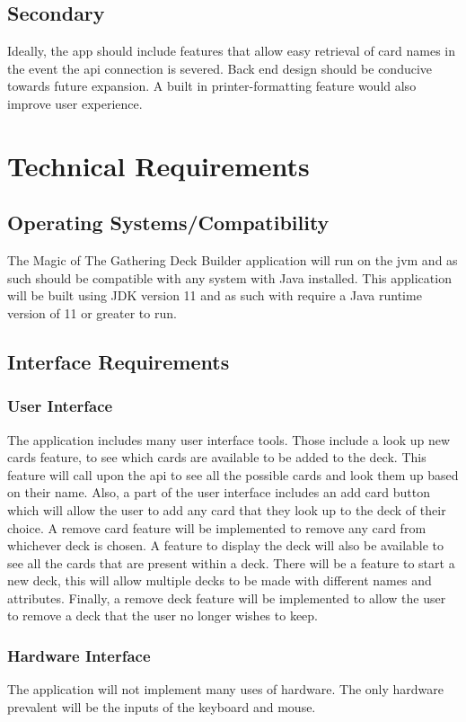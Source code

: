 \documentclass[12pt]{report}
\newcommand{\javaversion}{11 }
\begin{document}
\section{Secondary}
Ideally, the app should include features that allow easy retrieval of card names in the event the \acrshort{api} connection is severed. Back end design should be conducive towards future expansion. A built in printer-formatting feature would also improve user experience. 
\chapter{Technical Requirements}
\section{Operating Systems/Compatibility}
The Magic of The Gathering Deck Builder application will run on the \acrshort{jvm} and as such should be compatible with any system with Java installed. This application will be built using JDK version \javaversion and as such with require a Java runtime version of \javaversion or greater to run.
\section{Interface Requirements}
\subsection{User Interface}
The application includes many user interface tools. Those include a look up new cards feature, to see which cards are available to be added to the deck. This feature will call upon the \acrshort{api} to see all the possible cards and look them up based on their name. Also, a part of the user interface includes an add card button which will allow the user to add any card that they look up to the deck of their choice. A remove card feature will be implemented to remove any card from whichever deck is chosen. A feature to display the deck will also be available to see all the cards that are present within a deck. There will be a feature to start a new deck, this will allow multiple decks to be made with different names and attributes. Finally, a remove deck feature will be implemented to allow the user to remove a deck that the user no longer wishes to keep.
\subsection{Hardware Interface}
The application will not implement many uses of hardware. The only hardware prevalent will be the inputs of the keyboard and mouse.
\end{document}
